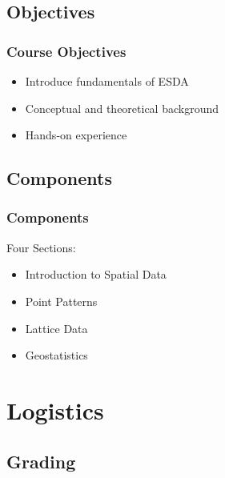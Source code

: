 \documentclass{beamer}
\begin{document}
\subsection[Objectives]{Objectives}


\begin{frame}
\frametitle{Course Objectives}

\begin{block}

\begin{itemize}
\item<2,5> Introduce fundamentals of ESDA
\item<3,5> Conceptual and theoretical background
\item<4,5> Hands-on experience
\end{itemize}

\end{block}

\end{frame}

\subsection[Components]{Components}


\begin{frame}
\frametitle{Components}

\begin{block}{Four Sections:}

\begin{itemize}
\item<2,6> Introduction to Spatial Data
\item<3,6> Point Patterns
\item<4,6> Lattice Data
\item<5,6> Geostatistics
\end{itemize}

\end{block}

\end{frame}

\section{Logistics}


\subsection{Grading}
\end{document}
